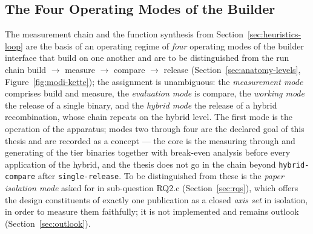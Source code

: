\begin{nurkurz}
\subsection{The Four Operating Modes of the Builder}\label{sec:heuristics-modes}
The measurement chain and the function synthesis from Section~\ref{sec:heuristics-loop} are the basis
of an operating regime of \emph{four} operating modes of the builder
interface that build on one another and are to be distinguished from the run chain build $\to$ measure
$\to$ compare $\to$ release (Section~\ref{sec:anatomy-levels}, Figure~\ref{fig:modi-kette}); the
assignment is unambiguous: the \emph{measurement mode} comprises build and measure, the
\emph{evaluation mode} is compare, the \emph{working mode} the release of a single binary, and the
\emph{hybrid mode} the release of a hybrid recombination, whose chain repeats on the hybrid level. The
first mode is the operation of the apparatus; modes two through four are the declared goal of this
thesis and are recorded as a concept --- the core is the measuring through and generating of the tier
binaries together with break-even analysis before every application of the hybrid, and the thesis does
not go in the chain beyond \texttt{hybrid-compare} after \texttt{single-release}. To be distinguished
from these is the \emph{paper isolation mode} asked for in sub-question RQ2.c (Section~\ref{sec:rqs}),
which offers the design constituents of exactly one publication as a closed \emph{axis set} in
isolation, in order to measure them faithfully; it is not implemented and remains outlook
(Section~\ref{sec:outlook}).
\end{nurkurz}

